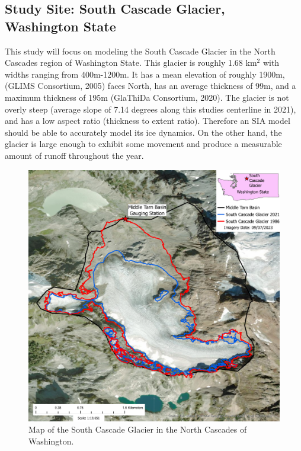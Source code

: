 \documentclass{article}
\begin{document}
\subsection{Study Site: South Cascade Glacier, Washington State}
This study will focus on modeling the South Cascade Glacier in the North Cascades region of Washington State. This glacier is 
roughly 1.68 km$^2$ with widths ranging from 400m-1200m. It has a mean elevation of roughly 1900m, (GLIMS Consortium, 2005) faces North, has 
an average thickness of 99m, and a maximum thickness of 195m (GlaThiDa Consortium, 2020). The glacier is 
not overly steep (average slope of 7.14 degrees along this studies centerline in 2021), and has a low aspect ratio 
(thickness to extent ratio). Therefore an SIA model should be able to accurately model its ice dynamics. On the other hand, 
the glacier is large enough to exhibit some movement and produce a measurable amount of runoff throughout the year.

\begin{figure}[h!]
    \centering
    \includegraphics[width=\textwidth]{Plots/SouthCascadeGlacierMap.pdf}
    \caption{Map of the South Cascade Glacier in the North Cascades of Washington.}
    \label{fig:south_cascade_glacier}
\end{figure}
\FloatBarrier
\end{document}
